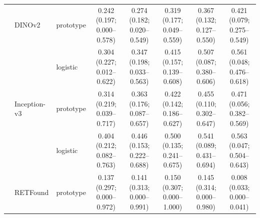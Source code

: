 \begin{tabular}{@{}lll*{5}{c}@{}}
 & DINOv2 & prototype & \makecell{0.242\\{\scriptsize (0.197; 0.000--0.578)}} & \makecell{0.274\\{\scriptsize (0.182; 0.020--0.549)}} & \makecell{0.319\\{\scriptsize (0.177; 0.049--0.559)}} & \makecell{0.367\\{\scriptsize (0.132; 0.127--0.550)}} & \makecell{0.421\\{\scriptsize (0.079; 0.275--0.549)}} \\
 &  & logistic & \makecell{0.304\\{\scriptsize (0.227; 0.012--0.622)}} & \makecell{0.347\\{\scriptsize (0.198; 0.033--0.563)}} & \makecell{0.415\\{\scriptsize (0.157; 0.139--0.608)}} & \makecell{0.507\\{\scriptsize (0.087; 0.380--0.606)}} & \makecell{0.561\\{\scriptsize (0.048; 0.476--0.618)}} \\
 & Inception-v3 & prototype & \makecell{0.314\\{\scriptsize (0.219; 0.039--0.717)}} & \makecell{0.363\\{\scriptsize (0.176; 0.087--0.657)}} & \makecell{0.422\\{\scriptsize (0.142; 0.186--0.627)}} & \makecell{0.455\\{\scriptsize (0.110; 0.302--0.647)}} & \makecell{0.471\\{\scriptsize (0.056; 0.382--0.569)}} \\
 &  & logistic & \makecell{0.404\\{\scriptsize (0.212; 0.082--0.763)}} & \makecell{0.446\\{\scriptsize (0.153; 0.222--0.688)}} & \makecell{0.500\\{\scriptsize (0.135; 0.241--0.675)}} & \makecell{0.541\\{\scriptsize (0.089; 0.431--0.694)}} & \makecell{0.563\\{\scriptsize (0.047; 0.504--0.643)}} \\
 & RETFound & prototype & \makecell{0.137\\{\scriptsize (0.297; 0.000--0.972)}} & \makecell{0.141\\{\scriptsize (0.313; 0.000--0.991)}} & \makecell{0.150\\{\scriptsize (0.307; 0.000--1.000)}} & \makecell{0.145\\{\scriptsize (0.314; 0.000--0.980)}} & \makecell{0.008\\{\scriptsize (0.033; 0.000--0.041)}} \\

\end{tabular}
